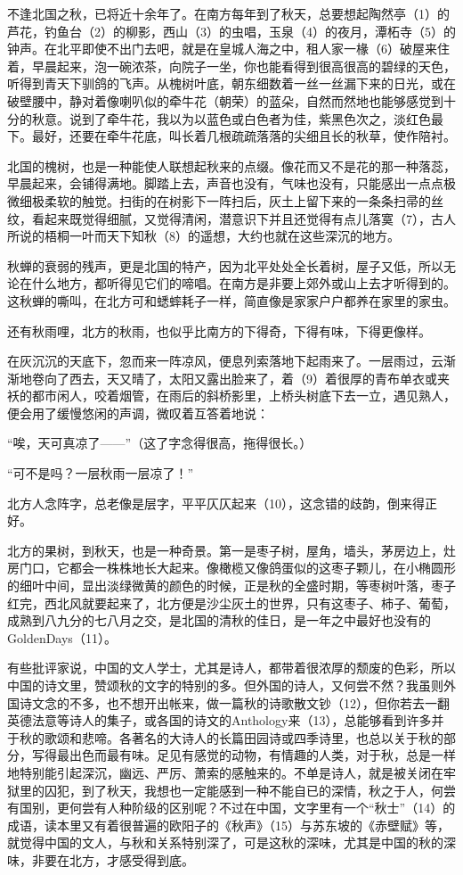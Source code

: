 \documentclass[letterpaper,12pt,english]{sphinxmanual}
\begin{document}
不逢北国之秋，已将近十余年了。在南方每年到了秋天，总要想起陶然亭（1）的芦花，钓鱼台（2）的柳影，西山（3）的虫唱，玉泉（4）的夜月，潭柘寺（5）的钟声。在北平即使不出门去吧，就是在皇城人海之中，租人家一椽（6）破屋来住着，早晨起来，泡一碗浓茶，向院子一坐，你也能看得到很高很高的碧绿的天色，听得到青天下驯鸽的飞声。从槐树叶底，朝东细数着一丝一丝漏下来的日光，或在破壁腰中，静对着像喇叭似的牵牛花（朝荣）的蓝朵，自然而然地也能够感觉到十分的秋意。说到了牵牛花，我以为以蓝色或白色者为佳，紫黑色次之，淡红色最下。最好，还要在牵牛花底，叫长着几根疏疏落落的尖细且长的秋草，使作陪衬。

北国的槐树，也是一种能使人联想起秋来的点缀。像花而又不是花的那一种落蕊，早晨起来，会铺得满地。脚踏上去，声音也没有，气味也没有，只能感出一点点极微细极柔软的触觉。扫街的在树影下一阵扫后，灰土上留下来的一条条扫帚的丝纹，看起来既觉得细腻，又觉得清闲，潜意识下并且还觉得有点儿落寞（7），古人所说的梧桐一叶而天下知秋（8）的遥想，大约也就在这些深沉的地方。

秋蝉的衰弱的残声，更是北国的特产，因为北平处处全长着树，屋子又低，所以无论在什么地方，都听得见它们的啼唱。在南方是非要上郊外或山上去才听得到的。这秋蝉的嘶叫，在北方可和蟋蟀耗子一样，简直像是家家户户都养在家里的家虫。

还有秋雨哩，北方的秋雨，也似乎比南方的下得奇，下得有味，下得更像样。

在灰沉沉的天底下，忽而来一阵凉风，便息列索落地下起雨来了。一层雨过，云渐渐地卷向了西去，天又晴了，太阳又露出脸来了，着（9）着很厚的青布单衣或夹袄的都市闲人，咬着烟管，在雨后的斜桥影里，上桥头树底下去一立，遇见熟人，便会用了缓慢悠闲的声调，微叹着互答着地说：

“唉，天可真凉了——”（这了字念得很高，拖得很长。）

“可不是吗？一层秋雨一层凉了！”

北方人念阵字，总老像是层字，平平仄仄起来（10），这念错的歧韵，倒来得正好。

北方的果树，到秋天，也是一种奇景。第一是枣子树，屋角，墙头，茅房边上，灶房门口，它都会一株株地长大起来。像橄榄又像鸽蛋似的这枣子颗儿，在小椭圆形的细叶中间，显出淡绿微黄的颜色的时候，正是秋的全盛时期，等枣树叶落，枣子红完，西北风就要起来了，北方便是沙尘灰土的世界，只有这枣子、柿子、葡萄，成熟到八九分的七八月之交，是北国的清秋的佳日，是一年之中最好也没有的GoldenDays（11）。

有些批评家说，中国的文人学士，尤其是诗人，都带着很浓厚的颓废的色彩，所以中国的诗文里，赞颂秋的文字的特别的多。但外国的诗人，又何尝不然？我虽则外国诗文念的不多，也不想开出帐来，做一篇秋的诗歌散文钞（12），但你若去一翻英德法意等诗人的集子，或各国的诗文的Anthology来（13），总能够看到许多并于秋的歌颂和悲啼。各著名的大诗人的长篇田园诗或四季诗里，也总以关于秋的部分，写得最出色而最有味。足见有感觉的动物，有情趣的人类，对于秋，总是一样地特别能引起深沉，幽远、严厉、萧索的感触来的。不单是诗人，就是被关闭在牢狱里的囚犯，到了秋天，我想也一定能感到一种不能自已的深情，秋之于人，何尝有国别，更何尝有人种阶级的区别呢？不过在中国，文字里有一个“秋士”（14）的成语，读本里又有着很普遍的欧阳子的《秋声》（15）与苏东坡的《赤壁赋》等，就觉得中国的文人，与秋和关系特别深了，可是这秋的深味，尤其是中国的秋的深味，非要在北方，才感受得到底。
\end{document}
